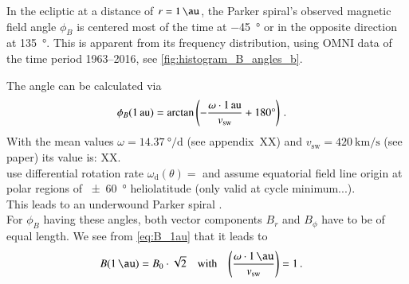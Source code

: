 In the ecliptic at a distance of $r = \SI{1}{\au}$, the Parker spiral's observed magnetic field angle $\phi_B$ is centered most of the time at \SI{-45}{\degree} or in the opposite direction at \SI{135}{\degree}. This is apparent from its frequency distribution, using OMNI data of the time period 1963--2016, see \autoref{fig:histogram_B_angles_b}.\\
\begin{figure}[htb]
\end{figure}
The angle can be calculated via
\begin{align}
	\phi_B(\SI{1}{au}) &= \arctan\left(-\frac{\omega \cdot \SI{1}{au}}{v_\text{sw}} + 180\degree\right)\,.
\end{align}
With the mean values $\omega = \SI{14.37}{\degree\per\day}$ (see appendix~XX) and $v_\text{sw} = \SI{420}{\km\per\s}$ (see paper) its value is: XX.\\
use differential rotation rate $\omega_\text{d}(\theta) = $ and assume equatorial field line origin at polar regions of \SI{+-60}{\degree} heliolatitude (only valid at cycle minimum...).\\
This leads to an underwound Parker spiral \citep{Banaszkiewicz1998}.\\

For $\phi_B$ having these angles, both vector components $B_r$ and $B_\phi$ have to be of equal length. We see from \autoref{eq:B_1au} that it leads to
\begin{align}
	B(\SI{1}{\au}) &= B_0 \cdot \sqrt{2}	&\text{with}	&	&	\left(\frac{\omega\cdot\SI{1}{\au}}{v_\text{sw}}\right) &= 1\,.
\end{align}




